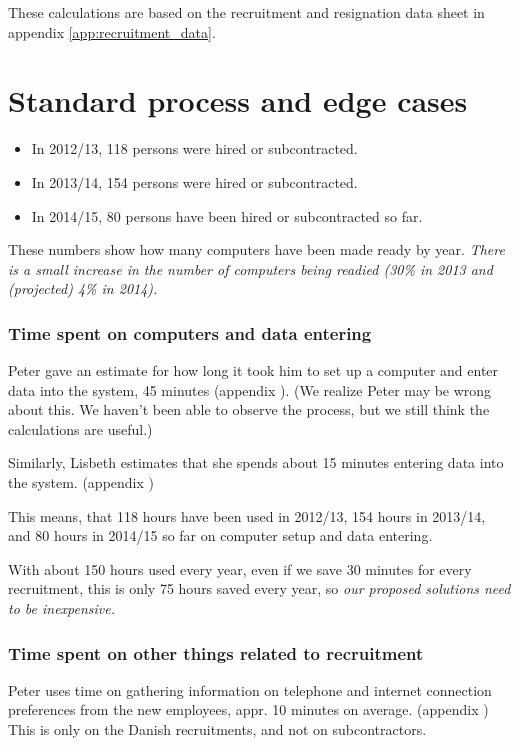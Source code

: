 \label{app:cost_benefit_analysis}
These calculations are based on the recruitment and resignation data sheet in appendix \ref{app:recruitment_data}.

\section{Standard process and edge cases}
\begin{itemize}
\item In 2012/13, 118 persons were hired or subcontracted.
\item In 2013/14, 154 persons were hired or subcontracted.
\item In 2014/15, 80 persons have been hired or subcontracted so far.
\end{itemize}
These numbers show how many computers have been made ready by year.
\emph{There is a small increase in the number of computers being readied (30\% in 2013 and (projected) 4\% in 2014).}

\subsubsection{Time spent on computers and data entering}
Peter gave an estimate for how long it took him to set up a computer and enter data into the system, 45 minutes (appendix ). (We realize Peter may be wrong about this. We haven't been able to observe the process, but we still think the calculations are useful.)

Similarly, Lisbeth estimates that she spends about 15 minutes entering data into the system. (appendix )

This means, that 118 hours have been used in 2012/13, 154 hours in 2013/14, and 80 hours in 2014/15 so far on computer setup and data entering.

With about 150 hours used every year, even if we save 30 minutes for every recruitment, this is only 75 hours saved every year, so \emph{our proposed solutions need to be inexpensive.}

\subsubsection{Time spent on other things related to recruitment}
Peter uses time on gathering information on telephone and internet connection preferences from the new employees, appr. 10 minutes on average.
(appendix )
This is only on the Danish recruitments, and not on subcontractors.

